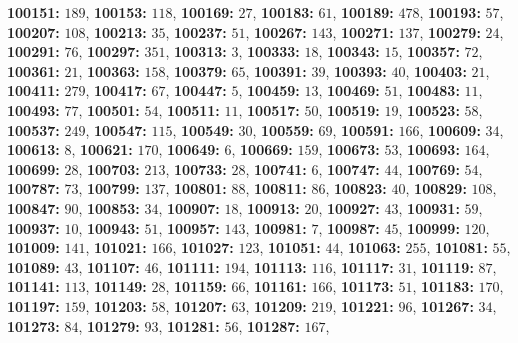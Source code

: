 \textsf{\bfseries 100151:} $189$, \textsf{\bfseries 100153:} $118$, \textsf{\bfseries 100169:} $27$, \textsf{\bfseries 100183:} $61$, \textsf{\bfseries 100189:} $478$, \textsf{\bfseries 100193:} $57$, \textsf{\bfseries 100207:} $108$, \textsf{\bfseries 100213:} $35$, \textsf{\bfseries 100237:} $51$, \textsf{\bfseries 100267:} $143$, \textsf{\bfseries 100271:} $137$, \textsf{\bfseries 100279:} $24$, \textsf{\bfseries 100291:} $76$, \textsf{\bfseries 100297:} $351$, \textsf{\bfseries 100313:} $3$, \textsf{\bfseries 100333:} $18$, \textsf{\bfseries 100343:} $15$, \textsf{\bfseries 100357:} $72$, \textsf{\bfseries 100361:} $21$, \textsf{\bfseries 100363:} $158$, \textsf{\bfseries 100379:} $65$, \textsf{\bfseries 100391:} $39$, \textsf{\bfseries 100393:} $40$, \textsf{\bfseries 100403:} $21$, \textsf{\bfseries 100411:} $279$, \textsf{\bfseries 100417:} $67$, \textsf{\bfseries 100447:} $5$, \textsf{\bfseries 100459:} $13$, \textsf{\bfseries 100469:} $51$, \textsf{\bfseries 100483:} $11$, \textsf{\bfseries 100493:} $77$, \textsf{\bfseries 100501:} $54$, \textsf{\bfseries 100511:} $11$, \textsf{\bfseries 100517:} $50$, \textsf{\bfseries 100519:} $19$, \textsf{\bfseries 100523:} $58$, \textsf{\bfseries 100537:} $249$, \textsf{\bfseries 100547:} $115$, \textsf{\bfseries 100549:} $30$, \textsf{\bfseries 100559:} $69$, \textsf{\bfseries 100591:} $166$, \textsf{\bfseries 100609:} $34$, \textsf{\bfseries 100613:} $8$, \textsf{\bfseries 100621:} $170$, \textsf{\bfseries 100649:} $6$, \textsf{\bfseries 100669:} $159$, \textsf{\bfseries 100673:} $53$, \textsf{\bfseries 100693:} $164$, \textsf{\bfseries 100699:} $28$, \textsf{\bfseries 100703:} $213$, \textsf{\bfseries 100733:} $28$, \textsf{\bfseries 100741:} $6$, \textsf{\bfseries 100747:} $44$, \textsf{\bfseries 100769:} $54$, \textsf{\bfseries 100787:} $73$, \textsf{\bfseries 100799:} $137$, \textsf{\bfseries 100801:} $88$, \textsf{\bfseries 100811:} $86$, \textsf{\bfseries 100823:} $40$, \textsf{\bfseries 100829:} $108$, \textsf{\bfseries 100847:} $90$, \textsf{\bfseries 100853:} $34$, \textsf{\bfseries 100907:} $18$, \textsf{\bfseries 100913:} $20$, \textsf{\bfseries 100927:} $43$, \textsf{\bfseries 100931:} $59$, \textsf{\bfseries 100937:} $10$, \textsf{\bfseries 100943:} $51$, \textsf{\bfseries 100957:} $143$, \textsf{\bfseries 100981:} $7$, \textsf{\bfseries 100987:} $45$, \textsf{\bfseries 100999:} $120$, \textsf{\bfseries 101009:} $141$, \textsf{\bfseries 101021:} $166$, \textsf{\bfseries 101027:} $123$, \textsf{\bfseries 101051:} $44$, \textsf{\bfseries 101063:} $255$, \textsf{\bfseries 101081:} $55$, \textsf{\bfseries 101089:} $43$, \textsf{\bfseries 101107:} $46$, \textsf{\bfseries 101111:} $194$, \textsf{\bfseries 101113:} $116$, \textsf{\bfseries 101117:} $31$, \textsf{\bfseries 101119:} $87$, \textsf{\bfseries 101141:} $113$, \textsf{\bfseries 101149:} $28$, \textsf{\bfseries 101159:} $66$, \textsf{\bfseries 101161:} $166$, \textsf{\bfseries 101173:} $51$, \textsf{\bfseries 101183:} $170$, \textsf{\bfseries 101197:} $159$, \textsf{\bfseries 101203:} $58$, \textsf{\bfseries 101207:} $63$, \textsf{\bfseries 101209:} $219$, \textsf{\bfseries 101221:} $96$, \textsf{\bfseries 101267:} $34$, \textsf{\bfseries 101273:} $84$, \textsf{\bfseries 101279:} $93$, \textsf{\bfseries 101281:} $56$, \textsf{\bfseries 101287:} $167$, 
